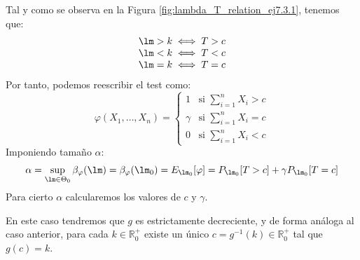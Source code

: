 \begin{ejercicio}
\begin{description}
            Tal y como se observa en la Figura \ref{fig:lambda_T_relation_ej7.3.1}, tenemos que:
            \begin{equation*}
                \begin{array}{l}
                    \lm > k \iff T > c \\
                    \lm < k \iff T < c \\
                    \lm = k \iff T = c
                \end{array}
            \end{equation*}
            Por tanto, podemos reescribir el test como:
            \begin{equation*}
                \varphi(X_1, \ldots, X_n) = \left\{\begin{array}{ll}
                    1 & \text{si\ } \sum\limits_{i=1}^{n} X_i > c \\
                     \gamma& \text{si\ } \sum\limits_{i=1}^{n}X_i = c \\
                     0& \text{si\ } \sum\limits_{i=1}^{n}X_i < c
                \end{array}\right. 
            \end{equation*}
            Imponiendo tamaño $\alpha$:
            \begin{equation*}
                \alpha = \sup_{\lm \in \Theta_0}\beta_\varphi(\lm) = \beta_\varphi(\lm_0) = E_{\lm_0}[\varphi] = P_{\lm_0}[T > c] + \gamma P_{\lm_0}[T=c]
            \end{equation*}
            Para cierto $\alpha$ calcularemos los valores de $c$ y $\gamma$.
        \item [Supuesto que $\lm_1 < \lm_0$.] En este caso tendremos que $g$ es estrictamente decreciente, y de forma análoga al caso anterior, para cada $k\in \mathbb{R}^+_0$ existe un único $c=g^{-1}(k)\in \mathbb{R}^+_0$ tal que $g(c)=k$.
            \begin{figure}[h]
                \centering
\end{figure}
\end{description}
\end{ejercicio}
